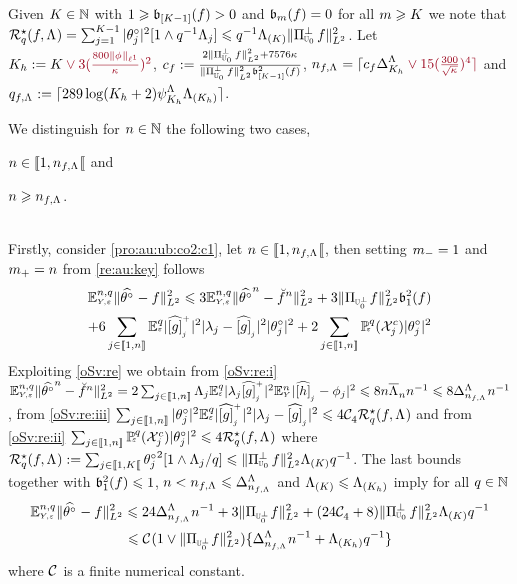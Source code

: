 \begin{pro}
Given $K\in\Nz$   with   $1\geq \bias[{[K-1] }](\xdf)>0$ and
$\bias(\xdf)=0$ for all $\Di\geq K$ we note that
$\mRa{\xdf,\iSv}=\sum_{j=1}^{K-1}|\fxdf[j]|^2[1\wedge\ssE^{-1}\iSv[j]]\leq
\ssE^{-1}\miSv[K]\VnormLp{\Proj[{\mHiH[0]}]^\perp\xdf}^2$. Let $K_{\ydf}:=K\dr\vee
3(\tfrac{800\Vnormlp[1]{\fydf}}{\cpen})^2$, 
$c_{\xdf}:=\tfrac{2\VnormLp{\Proj[{\mHiH[0]}]^\perp\xdf}^2+7576\cpen}{\VnormLp{\Proj[{\mHiH[0]}]^\perp\xdf}^2\bias[{[K-1]}]^2(\xdf)}$,
$\ssY_{\xdf,\iSv}=\ceil{c_{\xdf}\DipenSv[K_{\ydf}]\dr\vee15(\tfrac{300}{\sqrt{\cpen}})^4}$
and $\ssE_{\xdf,\iSv}:=\ceil{289\log(K_{\ydf}+2)\cmiSv[K_{\ydf}]\miSv[K_{\ydf}]}$.

We distinguish for $\ssY\in\Nz$ the following two
cases, \begin{inparaenum}[i]\renewcommand{\theenumi}{\dgrau\rm(\alph{enumi})}\item\label{pro:au:ub:co2:c1}
$\ssY\in\nsetro{1,\ssY_{\xdf,\iSv}}$ and \item\label{pro:au:ub:co2:c2}
$\ssY\geq\ssY_{\xdf,\iSv}$.\end{inparaenum}\\


Firstly, consider \ref{pro:au:ub:co2:c1},  let
$\ssY\in\nsetro{1,\ssY_{\xdf,\iSv}}$, then setting $\mDi=1$ and
$\pDi=\ssY$ from \cref{re:au:key} follows
\begin{multline*}
\FuEx[\ssY,\ssE]{\rY,\rE}\VnormLp{\hxdfPr[]-\xdf}^2\leq 
3\FuEx[\ssY,\ssE]{\rY,\rE}\VnormLp{\hxdfPr[\ssY]-\dxdfPr[\ssY]}^2
+3 \VnormLp{\Proj[{\mHiH[0]^\perp}]\xdf}^2\bias[1]^2(\xdf)\\
+6\sum_{j\in\nset{1,\ssY}}\FuEx[\ssE]{\rE}|\hfedfmpI[j]|^2|\fedf[j]-\hfedf[j]|^2|\fxdf[j]|^2
+2\sum_{j\in\nset{1,\ssY}}\FuVg[\ssE]{\rE}(\xEv^c)|\fxdf[j]|^2
\end{multline*}
Exploiting \cref{oSv:re} we obtain from 
\ref{oSv:re:i}
$\FuEx[\ssY,\ssE]{\rY,\rE}\VnormLp{\hxdfPr[\ssY]-\dxdfPr[\ssY]}^2=
2\sum_{j\in\nset{1,n}}\iSv[j]\FuEx[\ssE]{\rE}|\fedf[j]\hfedfmpI[j]|^2\FuEx[\ssY]{\rY}|\hfydf[j]-\fydf[j]|^2\leq8\ssY\oiSv[\ssY]\ssY^{-1}\leq 8\DipenSv[\ssY_{\xdf,\iSv}]\ssY^{-1}$, 
from \ref{oSv:re:iii}
$\sum_{j\in\nset{1,\ssY}}|\fxdf[j]|^2\FuEx[\ssE]{\rE}|\hfedfmpI[j]|^2|\fedf[j]-\hfedf[j]|^2\leq4\cst{4}\mRa{\xdf,\iSv}$
and from
\ref{oSv:re:ii}
$\sum_{j\in\nset{1,n}}\FuVg[\ssE]{\rE}(\xEv^c)|\fxdf[j]|^2
\leq4\mRa{\xdf,\iSv}$ where  $\mRa{\xdf,\iSv}:=\sum_{j\in\nsetro{1,K}}\fxdf[j]^2[1\wedge
\iSv[j]/\ssE]\leq\VnormLp{\Proj[{\mHiH[0]}]^\perp\xdf}^2\miSv[K]\ssE^{-1}$. The
last bounds together with $\bias[1]^2(\xdf)\leq1$, $\ssY<\ssY_{\xdf,\iSv}\leq\DipenSv[\ssY_{\xdf,\iSv}]$ and $\miSv[K]\leq\miSv[K_{\ydf}]$ imply for all $\ssE\in\Nz$
\begin{multline}\label{pro:au:ub:co2:e1}
\FuEx[\ssY,\ssE]{\rY,\rE}\VnormLp{\hxdfPr[]-\xdf}^2\leq 
24\DipenSv[\ssY_{\xdf,\iSv}]\ssY^{-1}+3 \VnormLp{\Proj[{\mHiH[0]^\perp}]\xdf}^2
+(24\cst{4}+8)\VnormLp{\Proj[{\mHiH[0]}]^\perp\xdf}^2\miSv[K]\ssE^{-1}\\\leq \cst{}(1\vee\VnormLp{\Proj[{\mHiH[0]^\perp}]\xdf}^2)\{\DipenSv[\ssY_{\xdf,\iSv}]\ssY^{-1}+\miSv[K_{\ydf}]\ssE^{-1}\}
\end{multline}
where $\cst{}$ is a finite numerical constant.


\end{pro}
